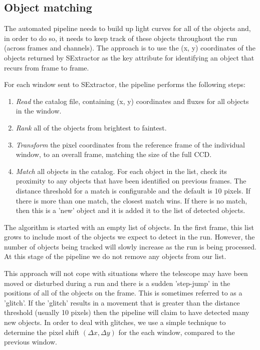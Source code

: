 \subsection{Object matching}
The automated pipeline needs to build up light curves for all of the objects and, in order to do so, it needs to keep track of these objects throughout the run (across frames and channels). The approach is to use the (x, y) coordinates of the objects returned by SExtractor as the key attribute for identifying an object that recurs from frame to frame. 

For each window sent to SExtractor, the pipeline performs the following steps:
\begin{enumerate}
  \item \emph{Read} the catalog file, containing (x, y) coordinates and fluxes for all objects in the window.
  \item \emph{Rank} all of the objects from brightest to faintest.
  \item \emph{Transform} the pixel coordinates from the reference frame of the individual window, to an overall frame, matching the size of the full CCD. 
  \item \emph{Match} all objects in the catalog. For each object in the list, check its proximity to any objects that have been identified on previous frames. The distance threshold for a match is configurable and the default is 10 pixels. If there is more than one match, the closest match wins. If there is no match, then this is a 'new' object and it is added it to the list of detected objects.  
\end{enumerate}

The algorithm is started with an empty list of objects. In the first frame, this list grows to include most of the objects we expect to detect in the run. However, the number of objects being tracked will slowly increase as the run is being processed. At this stage of the pipeline we do not remove any objects from our list. 

This approach will not cope with situations where the telescope may have been moved or disturbed during a run and there is a sudden 'step-jump' in the positions of all of the objects on the frame. This is sometimes referred to as a 'glitch'. If the 'glitch' results in a movement that is greater than the distance threshold (usually 10 pixels) then the pipeline will claim to have detected many new objects. In order to deal with glitches, we use a simple technique to determine the pixel shift $(\Delta x, \Delta y)$ for the each window, compared to the previous window. 

